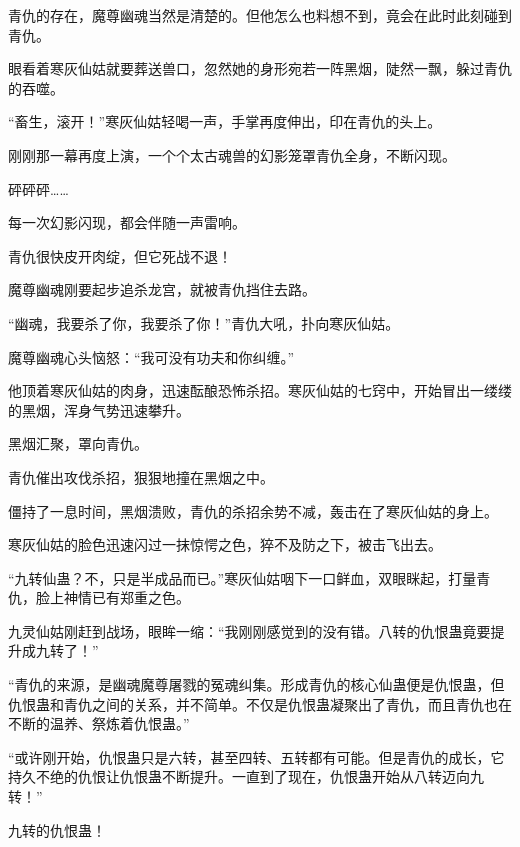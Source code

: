 \begin{this_body}
青仇的存在，魔尊幽魂当然是清楚的。但他怎么也料想不到，竟会在此时此刻碰到青仇。

眼看着寒灰仙姑就要葬送兽口，忽然她的身形宛若一阵黑烟，陡然一飘，躲过青仇的吞噬。

“畜生，滚开！”寒灰仙姑轻喝一声，手掌再度伸出，印在青仇的头上。

刚刚那一幕再度上演，一个个太古魂兽的幻影笼罩青仇全身，不断闪现。

砰砰砰……

每一次幻影闪现，都会伴随一声雷响。

青仇很快皮开肉绽，但它死战不退！

魔尊幽魂刚要起步追杀龙宫，就被青仇挡住去路。

“幽魂，我要杀了你，我要杀了你！”青仇大吼，扑向寒灰仙姑。

魔尊幽魂心头恼怒：“我可没有功夫和你纠缠。”

他顶着寒灰仙姑的肉身，迅速酝酿恐怖杀招。寒灰仙姑的七窍中，开始冒出一缕缕的黑烟，浑身气势迅速攀升。

黑烟汇聚，罩向青仇。

青仇催出攻伐杀招，狠狠地撞在黑烟之中。

僵持了一息时间，黑烟溃败，青仇的杀招余势不减，轰击在了寒灰仙姑的身上。

寒灰仙姑的脸色迅速闪过一抹惊愕之色，猝不及防之下，被击飞出去。

“九转仙蛊？不，只是半成品而已。”寒灰仙姑咽下一口鲜血，双眼眯起，打量青仇，脸上神情已有郑重之色。

九灵仙姑刚赶到战场，眼眸一缩：“我刚刚感觉到的没有错。八转的仇恨蛊竟要提升成九转了！”

“青仇的来源，是幽魂魔尊屠戮的冤魂纠集。形成青仇的核心仙蛊便是仇恨蛊，但仇恨蛊和青仇之间的关系，并不简单。不仅是仇恨蛊凝聚出了青仇，而且青仇也在不断的温养、祭炼着仇恨蛊。”

“或许刚开始，仇恨蛊只是六转，甚至四转、五转都有可能。但是青仇的成长，它持久不绝的仇恨让仇恨蛊不断提升。一直到了现在，仇恨蛊开始从八转迈向九转！”

九转的仇恨蛊！

\end{this_body}

